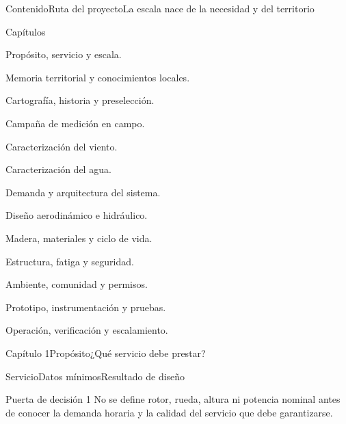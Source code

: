 \documentclass{../plantilla/hvtbook}
\begin{document}
\HVTMakeTitle

\begin{HVTPage}{Contenido}{Ruta del proyecto}{La escala nace de la necesidad y del territorio}
\begin{HVTTaskOrdered}{Capítulos}
  \item Propósito, servicio y escala.
  \item Memoria territorial y conocimientos locales.
  \item Cartografía, historia y preselección.
  \item Campaña de medición en campo.
  \item Caracterización del viento.
  \item Caracterización del agua.
  \item Demanda y arquitectura del sistema.
  \item Diseño aerodinámico e hidráulico.
  \item Madera, materiales y ciclo de vida.
  \item Estructura, fatiga y seguridad.
  \item Ambiente, comunidad y permisos.
  \item Prototipo, instrumentación y pruebas.
  \item Operación, verificación y escalamiento.
\end{HVTTaskOrdered}
\end{HVTPage}

\begin{HVTPage}{Capítulo 1}{Propósito}{¿Qué servicio debe prestar?}
\begin{HVTTable}{Servicio}{Datos mínimos}{Resultado de diseño}
\end{HVTTable}
\begin{HVTWarning}{Puerta de decisión 1}
No se define rotor, rueda, altura ni potencia nominal antes de conocer la demanda horaria y la calidad del servicio que debe garantizarse.
\end{HVTWarning}
\end{HVTPage}
\end{document}
